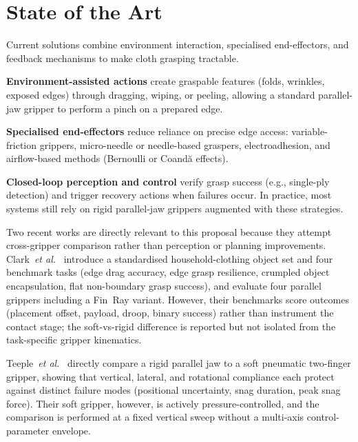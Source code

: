 \documentclass[10pt,letterpaper]{article}
\begin{document}
\section{State of the Art}
\label{sec:sota}
Current solutions combine environment interaction, specialised
end-effectors, and feedback mechanisms to make cloth grasping
tractable.

\textbf{Environment-assisted actions} create graspable features
(folds, wrinkles, exposed edges) through dragging, wiping, or peeling,
allowing a standard parallel-jaw gripper to perform a pinch on a
prepared edge.

\textbf{Specialised end-effectors} reduce reliance on precise edge access:
variable-friction grippers, micro-needle or needle-based graspers,
electroadhesion, and airflow-based methods (Bernoulli or Coand\u{a}
effects).

\textbf{Closed-loop perception and control} verify grasp success
(e.g., single-ply detection) and trigger recovery actions when failures
occur. In practice, most systems still rely on rigid parallel-jaw
grippers augmented with these strategies.

Two recent works are directly relevant to this proposal because they
attempt cross-gripper comparison rather than perception or planning
improvements. Clark~\textit{et al.}~\cite{Clark2023} introduce a
standardised household-clothing object set and four benchmark tasks
(edge drag accuracy, edge grasp resilience, crumpled object
encapsulation, flat non-boundary grasp success), and evaluate four
parallel grippers including a Fin~Ray\textregistered{} variant. However,
their benchmarks score outcomes (placement offset, payload, droop,
binary success) rather than instrument the contact stage; the soft-vs-rigid
difference is reported but not isolated from the task-specific
gripper kinematics.

Teeple~\textit{et al.}~\cite{Teeple2022} directly compare a rigid
parallel jaw to a soft pneumatic two-finger gripper, showing that
vertical, lateral, and rotational compliance each protect against
distinct failure modes (positional uncertainty, snag duration, peak
snag force). Their soft gripper, however, is actively pressure-controlled,
and the comparison is performed at a fixed vertical sweep without a
multi-axis control-parameter envelope.
\end{document}
